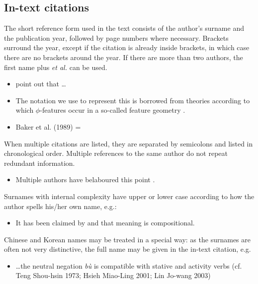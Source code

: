 \documentclass[charis,linguex,biblatex]{glossa}
\begin{document}
\subsection{In-text citations}

The short reference form used in the text consists of the author’s surname and the publication year, followed by page numbers where necessary. Brackets surround the year, except if the citation is already inside brackets, in which case there are no brackets around the year. If there are more than two authors, the first name plus \textit{et al.} can be used.

\begin{itemize}
\item \citet{murray:1983} point out that \ldots
\item The notation we use to represent this is borrowed from theories according to which $\phi$-features occur in a so-called feature geometry \citep[248-250]{mccarthy:1999}.
\item Baker et al. (1989) = \citet*{baker:1989}
\end{itemize}
When multiple citations are listed, they are separated by semicolons and listed in chronological order. Multiple references to the same author do not repeat redundant information.

\begin{itemize}
\item Multiple authors have belaboured this point \citep{chomsky:1981,chomsky:1986a,chomsky:1986,iverson:1989,casali:1998a,blevins:2004,franks:2005}.
\end{itemize}
Surnames with internal complexity have upper or lower case according to how the author spells his/her own name, e.g.:

\begin{itemize}
\item It has been claimed by \citet{swart:1998} and \citet{belder:2011} that meaning is compositional. 
\end{itemize}
Chinese and Korean names may be treated in a special way: as the surnames are often not very distinctive, the full name may be given in the in-text citation, e.g.

\begin{itemize}
\item  \ldots the neutral negation \textit{bù} is compatible with stative and activity verbs (cf. Teng Shou-hsin 1973; Hsieh Miao-Ling 2001; Lin Jo-wang 2003) %
\end{itemize}
\end{document}
